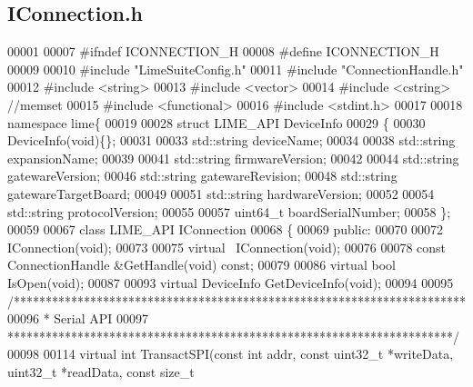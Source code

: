 \subsection{I\+Connection.\+h}
\label{IConnection_8h_source}

\begin{DoxyCode}
00001 
00007 \textcolor{preprocessor}{#ifndef ICONNECTION\_H}
00008 \textcolor{preprocessor}{#define ICONNECTION\_H}
00009 
00010 \textcolor{preprocessor}{#include "LimeSuiteConfig.h"}
00011 \textcolor{preprocessor}{#include "ConnectionHandle.h"}
00012 \textcolor{preprocessor}{#include <string>}
00013 \textcolor{preprocessor}{#include <vector>}
00014 \textcolor{preprocessor}{#include <cstring>} \textcolor{comment}{//memset}
00015 \textcolor{preprocessor}{#include <functional>}
00016 \textcolor{preprocessor}{#include <stdint.h>}
00017 
00018 \textcolor{keyword}{namespace }lime\{
00019 
00028 \textcolor{keyword}{struct }LIME_API DeviceInfo
00029 \{
00030     DeviceInfo(\textcolor{keywordtype}{void})\{\};
00031 
00033     std::string deviceName;
00034 
00038     std::string expansionName;
00039 
00041     std::string firmwareVersion;
00042 
00044     std::string gatewareVersion;
00046     std::string gatewareRevision;
00048     std::string gatewareTargetBoard;
00049 
00051     std::string hardwareVersion;
00052 
00054     std::string protocolVersion;
00055 
00057     uint64\_t boardSerialNumber;
00058 \};
00059 
00067 \textcolor{keyword}{class }LIME_API IConnection
00068 \{
00069 \textcolor{keyword}{public}:
00070 
00072     IConnection(\textcolor{keywordtype}{void});
00073 
00075     \textcolor{keyword}{virtual} ~IConnection(\textcolor{keywordtype}{void});
00076 
00078     \textcolor{keyword}{const} ConnectionHandle &GetHandle(\textcolor{keywordtype}{void}) \textcolor{keyword}{const};
00079 
00086     \textcolor{keyword}{virtual} \textcolor{keywordtype}{bool} IsOpen(\textcolor{keywordtype}{void});
00087 
00093     \textcolor{keyword}{virtual} DeviceInfo GetDeviceInfo(\textcolor{keywordtype}{void});
00094 
00095     \textcolor{comment}{/***********************************************************************}
00096 \textcolor{comment}{     * Serial API}
00097 \textcolor{comment}{     **********************************************************************/}
00098 
00114     \textcolor{keyword}{virtual} \textcolor{keywordtype}{int} TransactSPI(\textcolor{keyword}{const} \textcolor{keywordtype}{int} addr, \textcolor{keyword}{const} uint32\_t *writeData, uint32\_t *readData, \textcolor{keyword}{const} \textcolor{keywordtype}{size\_t} 

\end{DoxyCode}
